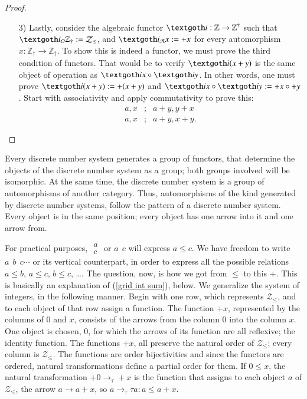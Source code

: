 \documentclass [12pt]{book}
\begin{document}
\begin{proof}
\begin{itemize}
 \item[3)]Lastly, consider the algebraic functor $\textgoth i:\mathbb Z\rightarrow\mathbb Z^\dagger$ such that $\textgoth i_\mathcal O\mathbb Z_\dagger:=\mathcal Z_\leq$, and $\textgoth i_\mathcal Ax:=+x$ for every automorphism $x:\mathbb Z_\dagger\rightarrow\mathbb Z_\dagger$. To show this is indeed a functor, we must prove the third condition of functors. That would be to verify $\textgoth i(x+y)$ is the same object of operation as $\textgoth ix\circ\textgoth iy$. In other words, one must prove $\textgoth i(x+y):=+(x+y)$ and $\textgoth ix\circ\textgoth iy:=+x\circ+y$. Start with associativity and apply commutativity to prove this:\begin{eqnarray}\nonumber a,x&;&a+y,y+x\\\nonumber a,x&;&a+y,x+y.\end{eqnarray}\end{itemize}\end{proof}

Every discrete number system generates a group of functors, that determine the objects of the discrete number system as a group; both groups involved will be isomorphic. At the same time, the discrete number system is a group of automorphisms of another category. Thus, automorphisms of the kind generated by discrete number systems, follow the pattern of a discrete number system. Every object is in the same position; every object has one arrow into it and one arrow from.

For practical purposes, $\begin{array}{rr} a \\ c \end{array}$ or $a~~c$ will express $a\leq c$. We have freedom to write $a~~b~~c\cdots$ or its vertical counterpart, in order to express all the possible relations $a\leq b$, $a\leq c$, $b\leq c$, \ldots. The question, now, is how we got from $\leq$ to this $+$. This is basically an explanation of (\ref{grid int sum}), below. We generalize the system of integers, in the following manner. Begin with one row, which represents $\mathcal{Z}_{\leq}$, and to each object of that row assign a function. The function $+x$, represented by the columns of $0$ and $x$, consists of the arrows from the column 0 into the column $x$. One object is chosen, $0$, for which the arrows of its function are all reflexive; the identity function. The functions $+x$, all preserve the natural order of $\mathcal{Z}_{\leq}$; every column is $\mathcal{Z}_{\leq}$. The functions are order bijectivities and since the functors are ordered, natural transformations define a partial order for them. If $0\leq x$, the natural transformation $+0\longrightarrow_{\tau}+x$ is the function that assigns to each object $a$ of $\mathcal{Z}_{\leq}$, the arrow $a\rightarrow a+x$, so $a\rightarrow_{\tau}\tau a:a\leq a+x$.
\end{document}
